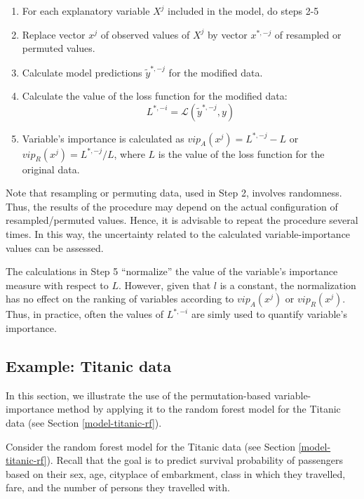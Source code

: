 \documentclass[12pt,]{krantz}
\providecommand{\tightlist}{%
  \setlength{\itemsep}{0pt}\setlength{\parskip}{0pt}}
\begin{document}
\begin{enumerate}
\def\labelenumi{\arabic{enumi}.}
\tightlist
\item
  For each explanatory variable \(X^j\) included in the model, do steps 2-5
\item
  Replace vector \(x^j\) of observed values of \(X^j\) by vector \(x^{*,-j}\) of resampled or permuted values.
\item
  Calculate model predictions \(\widetilde{y}^{*,-j}\) for the modified data.
\item
  Calculate the value of the loss function for the modified data:
  \[
  L^{*,-i} = \mathcal L(\widetilde{y}^{*,-j}, y)
  \]
\item
  Variable's importance is calculated as \(vip_A(x^j) = L^{*,-j} - L\) or \(vip_R(x^j) = L^{*,-j} / L\), where \(L\) is the value of the loss function for the original data.
\end{enumerate}

Note that resampling or permuting data, used in Step 2, involves randomness. Thus, the results of the procedure may depend on the actual configuration of resampled/permuted values. Hence, it is advisable to repeat the procedure several times. In this way, the uncertainty related to the calculated variable-importance values can be assessed.

The calculations in Step 5 ``normalize'' the value of the variable's importance measure with respect to \(L\). However, given that \(l\) is a constant, the normalization has no effect on the ranking of variables according to \(vip_A(x^j)\) or \(vip_R(x^j)\). Thus, in practice, often the values of \(L^{*,-i}\) are simly used to quantify variable's importance.

\hypertarget{featureImportanceTitanic}{%
\subsection{Example: Titanic data}\label{featureImportanceTitanic}}

In this section, we illustrate the use of the permutation-based variable-importance method by applying it to the random forest model for the Titanic data (see Section \ref{model-titanic-rf}).

Consider the random forest model for the Titanic data (see Section \ref{model-titanic-rf}). Recall that the goal is to predict survival probability of passengers based on their sex, age, cityplace of embarkment, class in which they travelled, fare, and the number of persons they travelled with.
\end{document}
